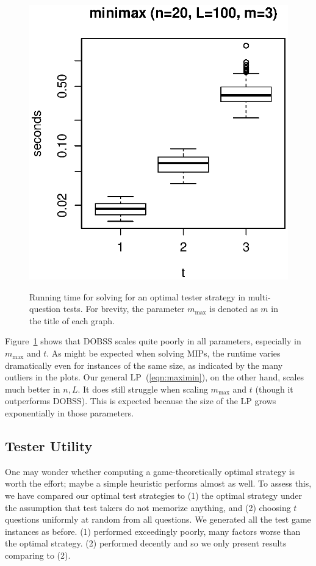 \documentclass{article}
\begin{document}
\begin{figure}[H]
	\includegraphics[width=.23\linewidth]{multi/minimax_t}\\
\vspace{-.2in}
	\caption{Running time for solving for an optimal tester strategy in
	multi-question tests.  For brevity, the parameter $m_{\text{max}}$ is denoted as $m$
	 in the title of each graph.}
	\label{fig:multi}
\end{figure}

Figure~\ref{fig:multi} shows that DOBSS scales quite poorly 
 in
all parameters, especially in $m_{\text{max}}$ and $t$. 
As might be expected when solving MIPs, the runtime varies dramatically even for
instances of the same size, as indicated by the many outliers in the plots.
Our general LP~(\ref{eqn:maximin}), on the other hand, scales much better
in $n, L$.  It does still struggle when scaling $m_{\text{max}}$ and $t$
(though it outperforms DOBSS).  This is expected because the size of the LP
grows exponentially in those parameters.

\subsection{Tester Utility}

One may wonder whether computing a game-theoretically optimal strategy is
worth the effort; maybe a simple heuristic performs almost as well.
To assess this, we have compared our optimal test strategies to (1) the
optimal 
strategy under the assumption that test takers do not memorize anything, and (2)
choosing $t$ questions uniformly at random from all questions.
We generated all the test game instances as before.
(1) performed exceedingly poorly, many factors worse than the optimal
strategy.
(2) performed decently and so we only present results comparing to (2).
\end{document}
